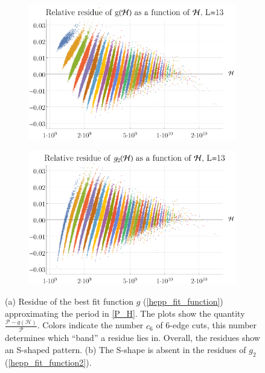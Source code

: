 \documentclass[11pt,a4paper]{article}
\newcommand{\period}{\mathcal P}
\renewcommand{\|}{\rule[-0.4ex]{0.2ex}{1.2em}}
\begin{document}
\begin{figure}[htbp]
	\begin{subfigure}[b]{.48 \textwidth}
		\includegraphics[width=\linewidth]{residue_g_13}
		\subcaption{}
		\label{fig:residue_g_13}
	\end{subfigure}
	\begin{subfigure}[b]{.48 \textwidth}
		\includegraphics[width=\linewidth]{residue_g2_13}
		\subcaption{}
		\label{fig:residue_g2_13}
	\end{subfigure}
	\caption{(a) Residue of the best fit function $g$  (\cref{hepp_fit_function}) approximating the period in  \cref{P_H}. The plots show the quantity $\frac{\period -g(\mathcal H)}{\period}$. Colors indicate the number $c_6$ of 6-edge cuts, this number determines which \enquote{band} a residue lies in. Overall, the residues show an S-shaped pattern. (b) The S-shape is absent in the residues of $g_2$ (\cref{hepp_fit_function2}).}
	\label{fig:residue_hepp}
\end{figure}
\end{document}
